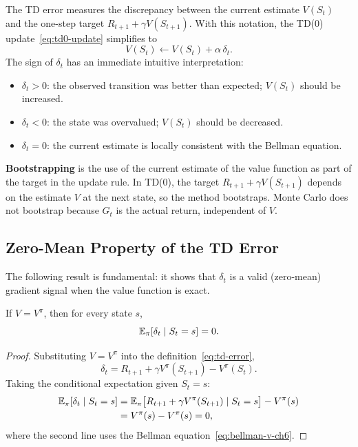 The TD error measures the discrepancy between the current estimate $V(S_t)$ and the one-step target $R_{t+1}+\gamma V(S_{t+1})$.  With this notation, the TD(0) update~\eqref{eq:td0-update} simplifies to
\[
V(S_t) \leftarrow V(S_t) + \alpha\,\delta_t.
\]
The sign of $\delta_t$ has an immediate intuitive interpretation:
\begin{itemize}[leftmargin=*]
  \item $\delta_t > 0$: the observed transition was better than expected; $V(S_t)$ should be increased.
  \item $\delta_t < 0$: the state was overvalued; $V(S_t)$ should be decreased.
  \item $\delta_t = 0$: the current estimate is locally consistent with the Bellman equation.
\end{itemize}

\begin{definition}[Bootstrapping]
\label{def:bootstrap}
\textbf{Bootstrapping} is the use of the current estimate of the value function as part of the target in the update rule.  In TD(0), the target $R_{t+1}+\gamma V(S_{t+1})$ depends on the estimate $V$ at the next state, so the method bootstraps.  Monte Carlo does not bootstrap because $G_t$ is the actual return, independent of $V$.
\end{definition}

\subsection{Zero-Mean Property of the TD Error}

The following result is fundamental: it shows that $\delta_t$ is a valid (zero-mean) gradient signal when the value function is exact.

\begin{theorem}
\label{thm:td-error-zero-mean}
If $V = V^\pi$, then for every state $s$,
\begin{equation}
\label{eq:td-zero-mean}
\operatorname{\mathbb{E}}_\pi[\delta_t \mid S_t = s] = 0.
\end{equation}
\end{theorem}

\begin{proof}
Substituting $V = V^\pi$ into the definition~\eqref{eq:td-error},
\[
\delta_t = R_{t+1} + \gamma V^\pi(S_{t+1}) - V^\pi(S_t).
\]
Taking the conditional expectation given $S_t = s$:
\begin{align*}
\operatorname{\mathbb{E}}_\pi[\delta_t \mid S_t = s]
&= \operatorname{\mathbb{E}}_\pi\bigl[R_{t+1} + \gamma V^\pi(S_{t+1}) \mid S_t = s\bigr] - V^\pi(s)\\
&= V^\pi(s) - V^\pi(s) = 0,
\end{align*}
where the second line uses the Bellman equation~\eqref{eq:bellman-v-ch6}.
\end{proof}

